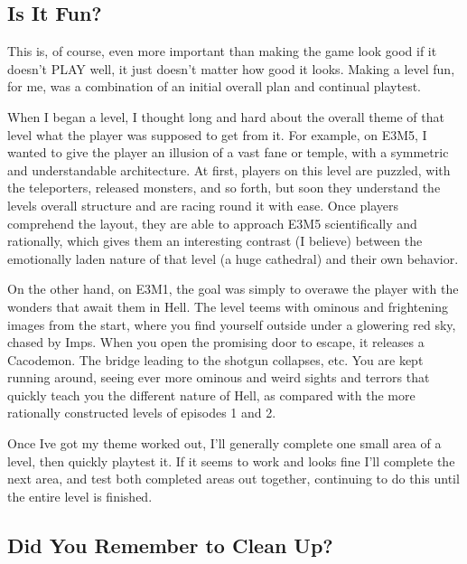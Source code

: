 \subsection{Is It Fun?}


This is, of course, even more important than making the game look good if it doesn't PLAY well, it just doesn't matter how good it looks. Making a level fun, for me, was a combination of an initial overall plan and continual playtest.\\
\par
 When I began a level, I thought long and hard about the overall theme of that level what the player was supposed to get from it. For example, on E3M5, I wanted to give the player an illusion of a vast fane or temple, with a symmetric and understandable architecture. At first, players on this level are puzzled, with the teleporters, released monsters, and so forth, but soon they understand the levels overall structure and are racing round it with ease. Once players comprehend the layout, they are able to approach E3M5 scientifically and rationally, which gives them an interesting contrast (I believe) between the emotionally laden nature of that level (a huge cathedral) and their own behavior.\\
 \par
  On the other hand, on E3M1, the goal was simply to overawe the player with the wonders that await them in Hell. The level teems with ominous and frightening images from the start, where you find yourself outside under a glowering red sky, chased by Imps. When you open the promising door to escape, it releases a Cacodemon. The bridge leading to the shotgun collapses, etc. You are kept running around, seeing ever more ominous and weird sights and terrors that quickly teach you the different nature of Hell, as compared with the more rationally constructed levels of episodes 1 and 2.\\
  \par
   Once Ive got my theme worked out, I'll generally complete one small area of a level, then quickly playtest it. If it seems to work and looks fine I'll complete the next area, and test both completed areas out together, continuing to do this until the entire level is finished.\\
   \par
    \subsection{Did You Remember to Clean Up?} 

